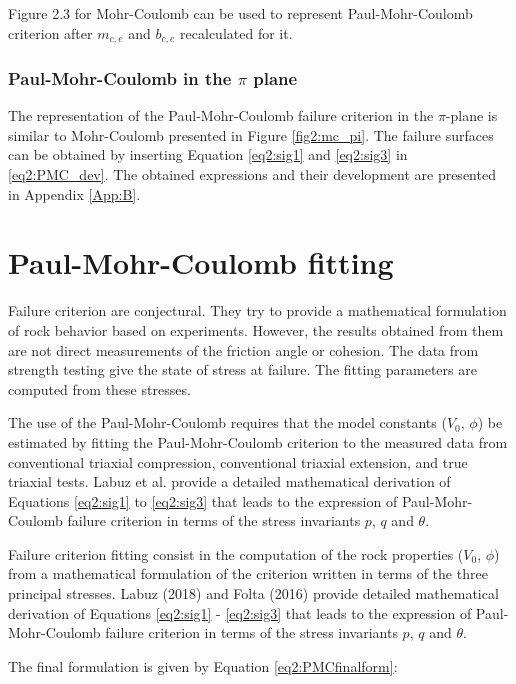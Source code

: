 Figure 2.3 for Mohr-Coulomb can be used to represent Paul-Mohr-Coulomb criterion after $m_{c,e}$ and $b_{c,e}$ recalculated for it.

\subsubsection{Paul-Mohr-Coulomb in the \texorpdfstring{$\pi$}{pi} plane}\label{ch2:PMC_pi}

The representation of the Paul-Mohr-Coulomb failure criterion in the $\pi$-plane is similar to Mohr-Coulomb presented in Figure \ref{fig2:mc_pi}. The failure surfaces can be obtained by inserting Equation \ref{eq2:sig1} and \ref{eq2:sig3} in \ref{eq2:PMC_dev}. The obtained expressions and their development are presented in Appendix \ref{App:B}. 

\section{Paul-Mohr-Coulomb fitting }\label{ch2:pmcfit}

Failure criterion are conjectural. They try to provide a mathematical formulation of rock behavior based on experiments. However, the results obtained from them are not direct measurements of the friction angle or cohesion. The data from strength testing give the state of stress at failure. The fitting parameters are computed from these stresses.

The use of the Paul-Mohr-Coulomb requires that the model constants ($V_0$, $\phi$) be estimated by fitting the Paul-Mohr-Coulomb criterion to the measured data from conventional triaxial compression, conventional triaxial extension, and true triaxial tests. Labuz et al. \cite{Labuz2018} provide a detailed mathematical derivation of Equations \ref{eq2:sig1} to \ref{eq2:sig3} that leads to the expression of Paul-Mohr-Coulomb failure criterion in terms of the stress invariants $p$, $q$ and $\theta$. 

Failure criterion fitting consist in the computation of the rock properties ($V_0$, $\phi$) from a mathematical formulation of the criterion written in terms of the three principal stresses. Labuz (2018) \cite{Labuz2018} and Folta (2016) \cite{Folta2016} provide detailed mathematical derivation of Equations \ref{eq2:sig1} - \ref{eq2:sig3} that leads to the expression of Paul-Mohr-Coulomb failure criterion in terms of the stress invariants $p$, $q$  and $\theta$. 

The final formulation is given by Equation \ref{eq2:PMCfinalform}:


